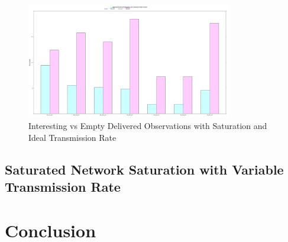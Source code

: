 	\begin{figure}[h]
	\centering
	\includegraphics[width=0.8\textwidth]{Chap7/figures/plots/saturated_ideal/intdelvemptdel_percent.png}
	\caption{Interesting vs Empty Delivered Observations with Saturation and Ideal Transmission Rate}
	\label{fig:sim:res:saturated:ideal:intempt}
	\end{figure}

\subsection{Saturated Network Saturation with Variable Transmission Rate}


\section{Conclusion} \label{sim:conc}
	







































